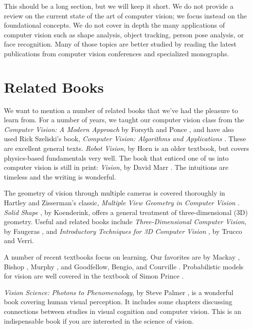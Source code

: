 This should be a long section, but we will keep it short. We do not provide a review on the current state of the art of computer vision; we focus instead on the foundational concepts. We do not cover in depth the many applications of computer vision such as shape analysis, object tracking, person pose analysis, or face recognition.
Many of those topics are better studied by reading the latest publications from computer vision conferences and specialized monographs.

\section*{Related Books}

We want to mention a number of related books that we've had the
pleasure to learn from.  For a number of years, we taught our computer vision class from the \textit{Computer Vision: A Modern Approach} by Forsyth and Ponce \cite{Forsyth2012}, and have
also used Rick Szeliski's book, \textit{Computer Vision: Algorithms and Applications} \cite{Szeliski2011}.  These are excellent general
texts.  \textit{Robot Vision}, by Horn  \cite{Horn86} is an older textbook, but covers
physics-based fundamentals very well.
The book that enticed one of us into computer 
vision is still in print:  \textit{Vision}, by David Marr  \cite{Marr2010}.  The intuitions 
are timeless and the writing is wonderful. 

The geometry of vision through multiple cameras is covered thoroughly
in Hartley and Zisserman's classic, \textit{Multiple View Geometry in Computer Vision} \cite{Hartley2004}.  \textit{Solid Shape} \cite{KoenderinkSolidShape1990}, by
Koenderink, offers a general treatment of three-dimensional (3D) geometry.
Useful and related books include \textit{Three-Dimensional Computer Vision}, by
Faugeras \cite{Faugeras93}, and \textit{Introductory Techniques for 3D Computer Vision} \cite{Trucco1998},
by Trucco and Verri.

A number of recent textbooks focus on learning.  Our favorites are by 
Mackay \cite{mackay2003information}, Bishop \cite{Bishop2006}, Murphy \cite{murphy2022}, and Goodfellow,
Bengio, and Courville \cite{Goodfellow-et-al-2016}.  Probabilistic models for vision are
well covered in the textbook of Simon Prince \cite{princeCVMLI2012}.

\textit{Vision Science: Photons to Phenomenology}, by Steve
Palmer \cite{Palmer1999}, is a wonderful book covering
human visual perception. It includes some chapters discussing
connections between studies in visual cognition and computer
vision. This is an indispensable 
book if you are interested in the science of vision.


